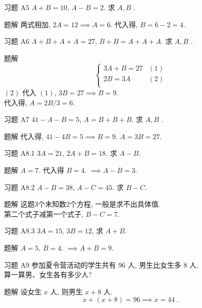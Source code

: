 \documentclass[content.tex]{subfiles}
\begin{document}
\begin{frame}{习题 A5}
$A+B=10$, $A-B=2$. 求 $A, B$ .
\begin{exampleblock}{题解}
两式相加, $2A=12\implies A=6$. 代入得, $B = 6 - 2 = 4$.
\end{exampleblock}
\end{frame}

\begin{frame}{习题 A6}
$A+B+A+A=27$, $B+B=A+A+A$. 求 $A, B$ .
\begin{exampleblock}{题解}
$$
\begin{cases}
3A+B=27 & (1) \\
2B=3A & (2) \\
\end{cases}
$$
$(2)$ 代入 $(1)$, $3B=27\implies B=9$. \\
代入得, $A=2B/3=6$.
\end{exampleblock}
\end{frame}

\begin{frame}{习题 A7}
$41-A-B=5$, $A=B+B+B$. 求 $A, B$ .
\begin{exampleblock}{题解}
代入得, $41-4B=5\implies B=9$. $A=3B=27$.
\end{exampleblock}
\end{frame}

\begin{frame}{习题 A8.1}
$3A=21$, $2A+B=18$. 求 $A-B$.
\begin{exampleblock}{题解}
$A=7$. 代入得 $B=4$. $\implies A-B=3$.
\end{exampleblock}
\end{frame}

\begin{frame}{习题 A8.2}
$A-B=38$, $A-C=45$. 求 $B-C$.
\begin{exampleblock}{题解}
这题3个未知数2个方程, 一般是求不出具体值.\\
第二个式子减第一个式子, $B-C=7$.
\end{exampleblock}
\end{frame}

\begin{frame}{习题 A8.3}
$3A=15$, $3B=12$, 求 $A+B$.
\begin{exampleblock}{题解}
$A=5$, $B=4$. $\implies A + B = 9$.
\end{exampleblock}
\end{frame}

\begin{frame}{习题 A9}
参加夏令营活动的学生共有 $96$ 人, 男生比女生多 $8$ 人, \\ 算一算男、女生各有多少人?
\begin{exampleblock}{题解}
设女生 $x$ 人, 则男生 $x + 8$ 人.
$$x + (x + 8) = 96\implies x=44\;.$$
\end{exampleblock}
\end{frame}
\end{document}
